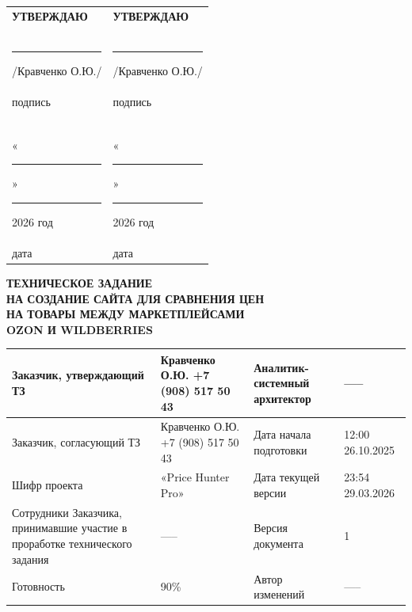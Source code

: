 \documentclass[a4paper,12pt]{article}
\begin{document}
\begin{titlepage}
\noindent
\begin{tabular*}{\textwidth}{@{}p{}@{\extracolsep{\fill}}p{}@{}}
	\centering\textbf{УТВЕРЖДАЮ} & \centering\textbf{УТВЕРЖДАЮ} \tabularnewline
	& \tabularnewline
	& \tabularnewline
	& \tabularnewline
	\rule{5cm}{0.4pt} /Кравченко О.Ю./ & \rule{5cm}{0.4pt} /Кравченко О.Ю./ \tabularnewline
	\centering подпись & \centering подпись \tabularnewline
	& \tabularnewline
	& \tabularnewline
	& \tabularnewline
	«\rule{1.5cm}{0.4pt}» \rule{4cm}{0.4pt} 2026 год & «\rule{1.5cm}{0.4pt}» \rule{4cm}{0.4pt} 2026 год \tabularnewline
	\centering дата & \centering дата \tabularnewline
\end{tabular*}

\vspace{0.5cm}

\begin{center}
	\textbf{ТЕХНИЧЕСКОЕ ЗАДАНИЕ} \\
	\textbf{НА СОЗДАНИЕ САЙТА ДЛЯ СРАВНЕНИЯ ЦЕН} \\
	\textbf{НА ТОВАРЫ МЕЖДУ МАРКЕТПЛЕЙСАМИ} \\
	\textbf{OZON И WILDBERRIES} \\
\end{center}

\vspace{0.5cm}

\footnotesize
\noindent
\begin{tabular}{|p{}|p{}|p{}|p{}|}
	\hline
	Заказчик, утверждающий ТЗ & Кравченко О.Ю. +7 (908) 517 50 43 & Аналитик-системный архитектор & ----- \\
	\hline
	Заказчик, согласующий ТЗ & Кравченко О.Ю. +7 (908) 517 50 43 & Дата начала подготовки & 12:00 26.10.2025 \\
	\hline
	Шифр проекта & «Price Hunter Pro» & Дата текущей версии & 23:54 29.03.2026 \\
	\hline
	Сотрудники Заказчика, принимавшие участие в проработке технического задания & ----- & Версия документа & 1 \\
	\hline
	Готовность & 90\% & Автор изменений &-----\\
	\hline
\end{tabular}

\vspace{0.5cm}

\vfill


\end{titlepage}
\end{document}
